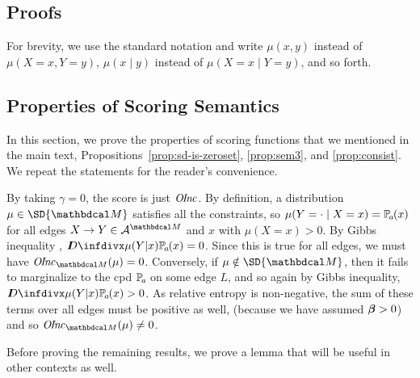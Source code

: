 \begin{subappendices}

\section{Proofs} \label{sec:proofs}
For brevity, we use the standard notation and write $\mu(x, y)$
instead of $\mu(X \!=\! x, Y \!=\! y)$, $\mu(x \mid y)$ instead of
$\mu(X \!=\! x\mid Y \!=\! y)$, and so forth.

	
\subsection{Properties of Scoring Semantics}

In this section, we prove the properties of scoring functions that we
mentioned in the main text,
Propositions~\ref{prop:sd-is-zeroset}, \ref{prop:sem3}, and
\ref{prop:consist}.  We repeat the statements for the reader's convenience.

\begin{lproof}\label{proof:sd-is-zeroset}
	 By taking $\gamma = 0$, the score is just $\mathit{O\mskip-2.5muI\mskip-3.5mun\mskip-1.7muc}$. By
			 definition, a distribution $\mu \in \SD{\dg M}$ satisfies
	  all the
			 constraints, so $\mu(Y = \cdot \mid X=x) =
			 \p_a(x)$ for all edges $X \rightarrow Y \in \Ar^{\dg
			   M}$ and $x$ with 
			 $\mu(X=x)>0$. By Gibbs inequality
			 \cite{mackay2003information}, 
			 $\kldiv{\mu(Y|x)}{\p_a(x)} = 0$. Since this is true
			 for all edges, we must have $\OInc_{\dg M}( \mu) =
			 0$. Conversely, if $\mu \notin \SD{\dg M}$, then it
			 fails to marginalize to the cpd $\p_a$ on some edge
							  $L$, and so again by Gibbs inequality,
			 $\kldiv{\mu(Y|x)}{\p_a(x)} > 0$. As relative entropy
			 is non-negative, the sum of these terms over all
			 edges must be positive as well, (because we have assumed $\boldsymbol\beta > 0$) and so $\OInc_{\dg M}(
			 \mu) \neq 0$. %
\end{lproof}


Before proving the remaining results, we prove a lemma that will be useful
in other contexts as well. 


\end{subappendices}
